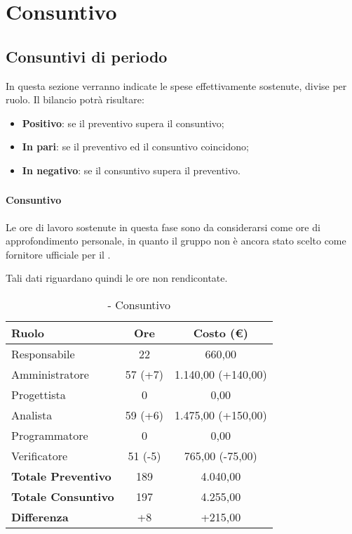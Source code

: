\documentclass[./PianoDiProgetto.tex]{subfiles}
\begin{document}
\section{Consuntivo}
\subsection{Consuntivi di periodo}
In questa sezione verranno indicate le spese effettivamente sostenute, divise per ruolo. Il bilancio potrà risultare:
\begin{itemize}
  \item \textbf{Positivo}: se il preventivo supera il consuntivo;
  \item \textbf{In pari}: se il preventivo ed il consuntivo coincidono;
  \item \textbf{In negativo}: se il consuntivo supera il preventivo.
\end{itemize}
\subsubsection{\PerAR}
	\paragraph{Consuntivo}
Le ore di lavoro sostenute in questa fase sono da considerarsi come ore di approfondimento personale, in quanto il gruppo \GRUPPO{} non è ancora stato scelto come fornitore ufficiale per il  \PROGETTO.
		
		Tali dati riguardano quindi le ore non rendicontate.

\begin{table}[h]
		\centering
		\begin{tabular}{l * {2}{c}}
			\toprule
			\textbf{Ruolo} & \textbf{Ore} & \textbf{Costo (\euro{})} \\
			\midrule
			Responsabile &	22 & 660,00 \\
			Amministratore & 57 (+7) & 1.140,00 (+140,00)\\
			Progettista & 0 & 0,00 \\
			Analista & 59 (+6) & 1.475,00 (+150,00)\\
			Programmatore & 0 & 0,00 \\
			Verificatore & 51 (-5) & 765,00 (-75,00)\\
			\midrule
			\textbf{Totale Preventivo} & 189
 & 4.040,00
 \\		
			\textbf{Totale Consuntivo} & 197 & 4.255,00
 \\
			\midrule
			\textbf{Differenza} & +8 & +215,00 \\
			\bottomrule
		\end{tabular}
		\caption{\PerAR{} - Consuntivo}
		\label{tab:consuntivoA}
		
	\end{table}		
		
\end{document}
